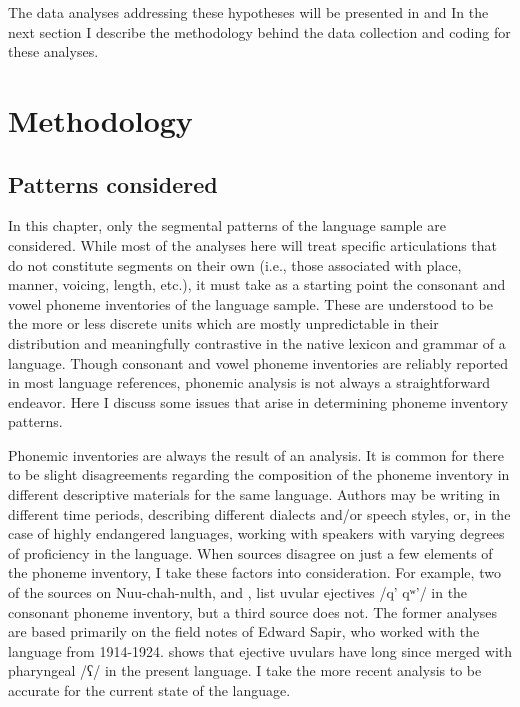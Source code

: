   The data analyses addressing these hypotheses will be presented in  and  In the next section I describe the methodology behind the data collection and coding for these analyses.

\section{Methodology}\label{sec:4.2}
\subsection{Patterns considered}\label{sec:4.2.1}

  In this chapter, only the segmental patterns of the language sample are considered. While most of the analyses here will treat specific articulations that do not constitute segments on their own (i.e., those associated with place, manner, voicing, length, etc.), it must take as a starting point the consonant and vowel phoneme inventories of the language sample. These are understood to be the more or less discrete units which are mostly unpredictable in their distribution and meaningfully contrastive in the native lexicon and grammar of a language. Though consonant and vowel phoneme inventories are reliably reported in most language references, phonemic analysis is not always a straightforward endeavor. Here I discuss some issues that arise in determining phoneme inventory patterns.

  Phonemic inventories are always the result of an analysis. It is common for there to be slight disagreements regarding the composition of the phoneme inventory in different descriptive materials for the same language. Authors may be writing in different time periods, describing different dialects and/or speech styles, or, in the case of highly endangered languages, working with speakers with varying degrees of proficiency in the language. When sources disagree on just a few elements of the phoneme inventory, I take these factors into consideration. For example, two of the sources on Nuu-chah-nulth, \citet{Stonham1999} and \citet{Davidson2002}, list uvular ejectives /q’ qʷ’/ in the consonant phoneme inventory, but a third source \citep{Kim2003} does not. The former analyses are based primarily on the field notes of Edward Sapir, who worked with the language from 1914-1924. \citet{Kim2003} shows that ejective uvulars have long since merged with pharyngeal /ʕ/ in the present language. I take the more recent analysis to be accurate for the current state of the language. 

